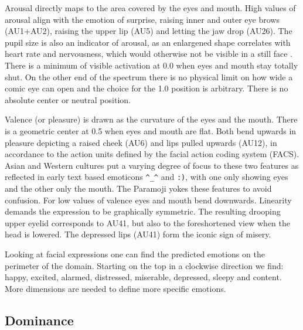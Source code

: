 Arousal directly maps to the area covered by the eyes and mouth.
High values of arousal align with the emotion of surprise, raising inner and outer eye brows (AU1+AU2), raising the upper lip (AU5)
and letting the jaw drop (AU26). The pupil size is also an indicator of arousal, as an enlargened shape correlates with heart rate and nervousness, which
would otherwise not be visible in a still face \cite{PupilSize}.
There is a minimum of visible activation at 0.0 when eyes and mouth stay totally shut.
On the other end of the spectrum there is no physical limit on how wide a comic eye can open and the choice for the 1.0 position is arbitrary.
There is no absolute center or neutral position.

Valence (or pleasure) is drawn as the curvature of the eyes and the mouth.
There is a geometric center at 0.5 when eyes and mouth are flat.
Both bend upwards in pleasure depicting a raised cheek (AU6) and lips pulled upwards (AU12),
in accordance to the action units defined by the facial action coding system (FACS).
Asian and Western cultures put a varying degree of focus to these two features
as reflected in early text based emoticons \texttt{\^{}\_\^} and \texttt{:)}, with one only showing eyes and the other only the mouth.
The Paramoji yokes these features to avoid confusion.
For low values of valence eyes and mouth bend downwards. Linearity demands the expression to be graphically symmetric.
The resulting drooping upper eyelid corresponds to AU41, but also to the foreshortened view when the head is lowered.
The depressed lips (AU41) form the iconic sign of misery.

Looking at facial expressions one can find the predicted emotions on the perimeter of the domain.
Starting on the top in a clockwise direction we find: happy, excited, alarmed, distressed, miserable, depressed, sleepy and content.
More dimensions are needed to define more specific emotions.


\subsection{Dominance}

